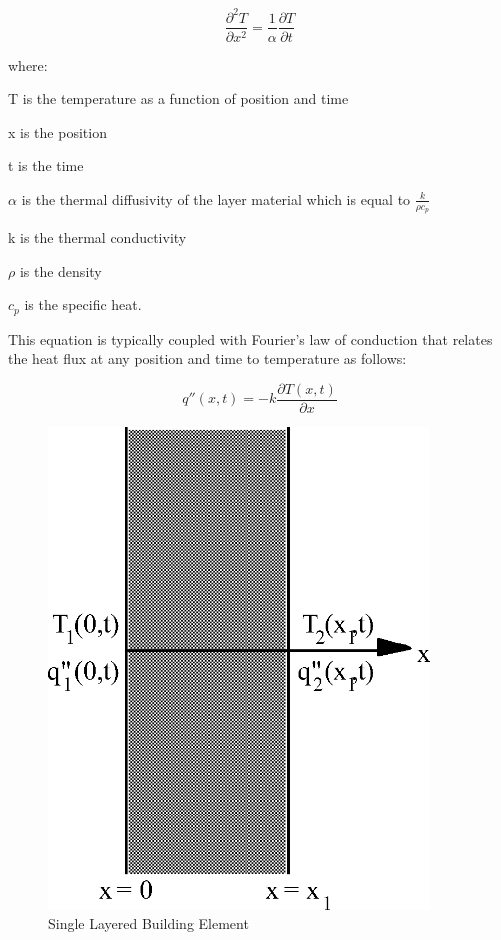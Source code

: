 \begin{equation}
\frac{{{\partial ^2}T}}{{\partial {x^2}}} = \frac{1}{\alpha }\frac{{\partial T}}{{\partial t}}
\label{eq:1DPartialDiffEqinTt}
\end{equation}

where: 

T is the temperature as a function of position and time

x is the position

t is the time

\(\alpha\) is the thermal diffusivity of the layer material which is equal to \(\frac{k}{{\rho {c_p}}}\)

k is the thermal conductivity

\(\rho\) is the density

\(c_p\) is the specific heat.

This equation is typically coupled with Fourier's law of conduction that relates the heat flux at any position and time to temperature as follows:

\begin{equation}
q''\left( {x,t} \right) =  - k\frac{{\partial T\left( {x,t} \right)}}{{\partial x}}
\label{eq:FouriersLawOfConduction}
\end{equation}

\begin{figure}[hbtp] %
\centering
\includegraphics[width=0.9\textwidth, height=0.9\textheight, keepaspectratio=true]{media/image5973.png}
\caption{Single Layered Building Element \protect \label{fig:single-layered-building-element}}
\end{figure}

